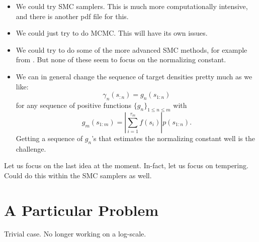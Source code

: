\documentclass{article}
\begin{document}
\begin{itemize}

\item We could try SMC samplers. This is much more computationally intensive, and there is another pdf file for this.
\item We could just try to do MCMC. This will have its own issues.
\item We could try to do some of the more advanced SMC methods, for example from \cite{tutorial_15_years_later}. But none of these seem to focus on the normalizing constant.
\item We can in general change the sequence of target densities pretty much as we like:
$$ \gamma_{n}(s_{:n}) = g_{n}(s_{1:n}) $$
for any sequence of positive functions $\{ g_{n} \}_{1 \leq n \leq m} $ with 
$$ g_{m}(s_{1:m}) = \left | \sum_{i=1}^{\tau_{m}} f(s_{i}) \right | p(s_{1:n}). $$ 
Getting a sequence of $g_{n}$'s that estimates the normalizing constant well is the challenge. 

\end{itemize}
 Let us focus on the last idea at the moment. In-fact, let us focus on tempering. 
\\ Could do this within the SMC samplers as well. 

\section{A Particular Problem}

Trivial case. No longer working on a log-scale. 
\end{document}
